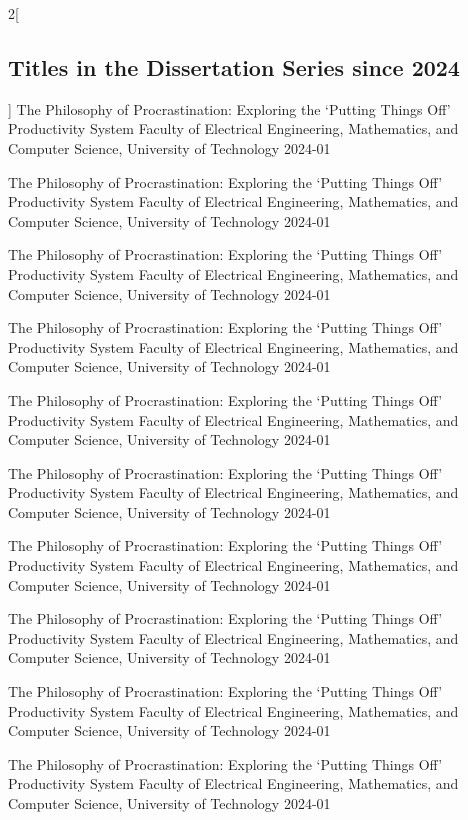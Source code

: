 \begin{multicols*}{2}[\subsection*{Titles in the Dissertation Series since 2024}]
         {The Philosophy of Procrastination: Exploring the `Putting Things Off' Productivity System}
         {Faculty of Electrical Engineering, Mathematics, and Computer Science, University of Technology}
         {2024-01}

         {The Philosophy of Procrastination: Exploring the `Putting Things Off' Productivity System}
         {Faculty of Electrical Engineering, Mathematics, and Computer Science, University of Technology}
         {2024-01}

         {The Philosophy of Procrastination: Exploring the `Putting Things Off' Productivity System}
         {Faculty of Electrical Engineering, Mathematics, and Computer Science, University of Technology}
         {2024-01}

         {The Philosophy of Procrastination: Exploring the `Putting Things Off' Productivity System}
         {Faculty of Electrical Engineering, Mathematics, and Computer Science, University of Technology}
         {2024-01}

         {The Philosophy of Procrastination: Exploring the `Putting Things Off' Productivity System}
         {Faculty of Electrical Engineering, Mathematics, and Computer Science, University of Technology}
         {2024-01}

         {The Philosophy of Procrastination: Exploring the `Putting Things Off' Productivity System}
         {Faculty of Electrical Engineering, Mathematics, and Computer Science, University of Technology}
         {2024-01}

         {The Philosophy of Procrastination: Exploring the `Putting Things Off' Productivity System}
         {Faculty of Electrical Engineering, Mathematics, and Computer Science, University of Technology}
         {2024-01}

         {The Philosophy of Procrastination: Exploring the `Putting Things Off' Productivity System}
         {Faculty of Electrical Engineering, Mathematics, and Computer Science, University of Technology}
         {2024-01}

         {The Philosophy of Procrastination: Exploring the `Putting Things Off' Productivity System}
         {Faculty of Electrical Engineering, Mathematics, and Computer Science, University of Technology}
         {2024-01}

         {The Philosophy of Procrastination: Exploring the `Putting Things Off' Productivity System}
         {Faculty of Electrical Engineering, Mathematics, and Computer Science, University of Technology}
         {2024-01}


\end{multicols*}
